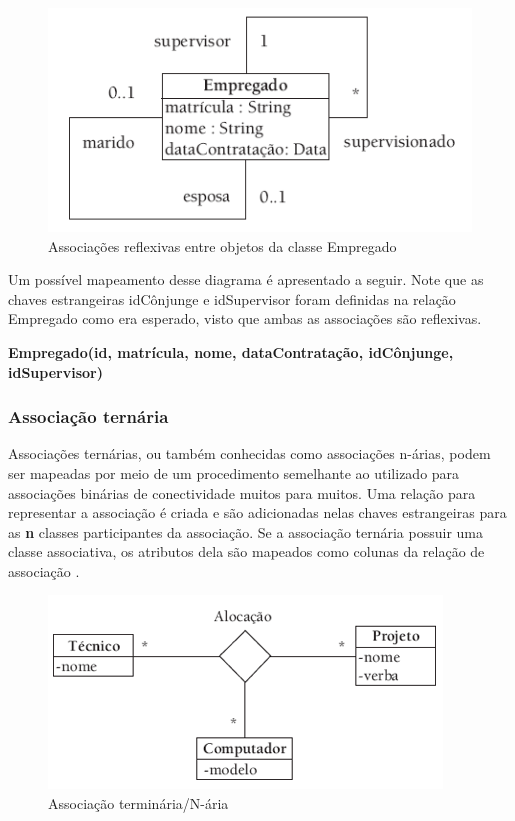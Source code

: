 \begin{figure}[H]
	\centering
	\includegraphics[scale=0.7]{imagens/reflexiva.png}
	\caption{Associações reflexivas entre objetos da classe Empregado}
	\label{fig:figura-01-banco-05}
\end{figure}

Um possível mapeamento desse diagrama é apresentado a seguir. Note que as chaves estrangeiras idCônjunge e idSupervisor foram definidas na relação Empregado como era esperado, visto que ambas as associações são reflexivas.

\textbf{Empregado(id, matrícula, nome, dataContratação, idCônjunge, idSupervisor)}

\subsubsection{Associação ternária}

Associações ternárias, ou também conhecidas como associações n-árias, podem ser mapeadas por meio de um procedimento semelhante ao utilizado para associações binárias de conectividade muitos para muitos. Uma relação para representar a associação é criada e são adicionadas nelas chaves estrangeiras para as \textbf{n} classes participantes da associação. Se a associação ternária possuir uma classe associativa, os atributos dela são mapeados como colunas da relação de associação \cite{bezerra2016principios}.

\begin{figure}[H]
	\centering
	\includegraphics[scale=0.7]{imagens/terminaria.png}
	\caption{Associação terminária/N-ária}
	\label{fig:figura-01-banco-06}
\end{figure}


